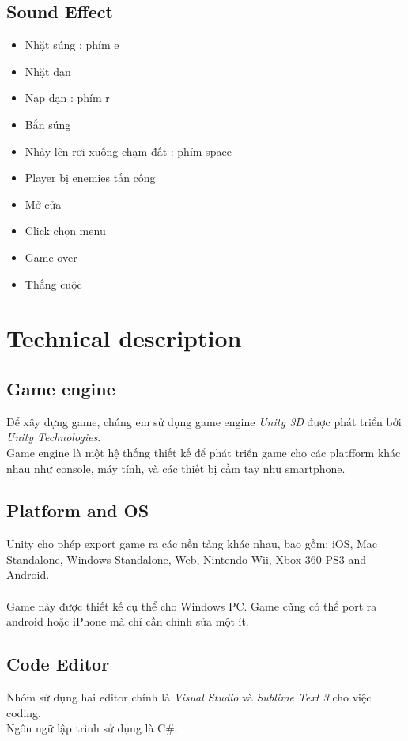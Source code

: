 \documentclass[14pt,a4paper]{extreport}
\begin{document}
\section{Sound Effect}
\begin{itemize}
	\item Nhặt súng : phím e
	\item Nhặt đạn	
	\item Nạp đạn	: phím r
	\item Bắn súng
	\item Nhảy lên rơi xuống chạm đất : phím space
	\item Player bị enemies tấn công
	\item Mở cửa
	\item Click chọn menu
	\item Game over
	\item Thắng cuộc
\end{itemize}


\chapter{Technical description}
\section{Game engine}
 Để xây dựng game, chúng em sử dụng game engine \textit{Unity 3D} được phát triển bởi \textit{Unity Technologies}. \\
 Game engine là một hệ thống thiết kế để phát triển game cho các platfform khác nhau như console, máy tính, và các thiết bị cầm tay như smartphone.
 

\section{Platform and OS}
Unity cho phép export game ra các nền tảng khác nhau, bao gồm: iOS, Mac
Standalone, Windows Standalone, Web, Nintendo Wii, Xbox 360 PS3 and Android.
\\
\\
Game này được thiết kế cụ thể cho Windows PC. Game cũng có thể port ra android hoặc iPhone mà chỉ cần chỉnh sửa một ít.

\section{Code Editor}
Nhóm sử dụng hai editor chính là \textit{Visual Studio} và \textit{Sublime Text 3} cho việc coding. \\
Ngôn ngữ lập trình sử dụng là C\#.
\end{document}

